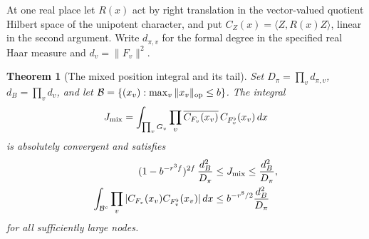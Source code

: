 \documentclass[a4paper,11pt]{article}
\newtheorem{theorem}[proposition]{Theorem}
\theoremstyle{definition}
\theoremstyle{remark}
\numberwithin{equation}{section}
\begin{document}
At one real place let \(R(x)\) act by right translation in the
vector-valued quotient Hilbert space of the unipotent character,
and put \(C_Z(x)=\langle Z,R(x)Z\rangle\), linear in the second
argument. Write \(d_{\pi,v}\) for the formal degree in the specified
real Haar measure and \(d_v=\|F_v\|^2\).

\begin{theorem}[The mixed position integral and its tail]\leavevmode
\label{thm:mixedmass876}
Set \(D_\pi=\prod_vd_{\pi,v}\), \(d_B=\prod_vd_v\), and let
\(\mathcal B=\{(x_v):\max_v\|x_v\|_{\rm op}\le b\}\).
The integral
\[
 J_{\rm mix}
   =\int_{\prod_vG_v}\prod_v
            \overline{C_{F_v}(x_v)}\,C_{F_v^\flat}(x_v)\,dx
\]
is absolutely convergent and satisfies
\begin{align}
  (1-b^{-r^3f})^{2f}\,\frac{d_B^2}{D_\pi}
       &\le J_{\rm mix}\le\frac{d_B^2}{D_\pi},
     \label{eq:mixedmass876}\\
 \int_{\mathcal B^c}\prod_v
          |C_{F_v}(x_v)C_{F_v^\flat}(x_v)|\,dx
       &\le b^{-r^8/2}\frac{d_B^2}{D_\pi}
     \label{eq:mixedtail876}
\end{align}
for all sufficiently large nodes.
\end{theorem}
\end{document}
